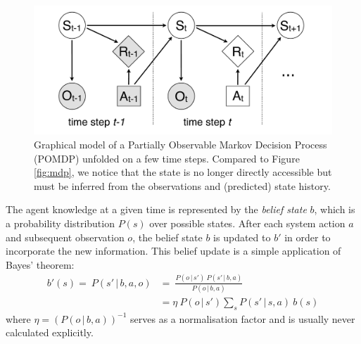 \begin{figure}[ht]
\centering
\includegraphics[scale=0.25]{imgs/POMDP.pdf}
\caption{Graphical model of a Partially Observable Markov Decision Process (POMDP) unfolded on a few time steps.  Compared to Figure \ref{fig:mdp}, we notice that the state is no longer directly accessible but must be inferred from the observations and (predicted) state history. }
\label{fig:pomdp}
\end{figure}

The agent knowledge at a given time is represented by the \textit{belief state} $b$, which is a probability distribution $P(s)$ over possible states.  After each system action $a$ and subsequent observation $o$, the belief state $b$ is updated to $b'$ in order to incorporate the new information.  This belief update is a simple application of Bayes' theorem:
\begin{align}
b'(s) = \ \!P(s'\, | \, b, a,o) & = \ \frac{P(o\, | \, s') \ P(s'\, | \, b,a)}{P(o\, | \, b,a)} \\[3mm]
& = \eta \ P(o\, | \, s') \sum_{s} P(s'\, |\, s,a) \ b(s) \label{eq:update}
\end{align}
where $\eta = (P(o\, | \, b,a))^{-1}$ serves as a normalisation factor and is usually never calculated explicitly. 

